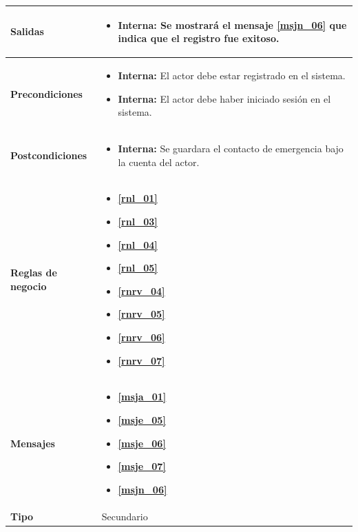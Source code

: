 \begin{center}
\begin{longtable}{| p{3.5cm} | p{11.5cm} |}
        \hline  
          \textbf{Salidas} &  
	\begin{itemize}
              \item \textbf{Interna}: Se mostrará el mensaje \textbf{\ref{msjn_06}} que indica que el registro fue exitoso.
           \end{itemize} \\
        \hline  
          \textbf{Precondiciones} & 
		\begin{itemize}
	              \item \textbf{Interna:} El actor debe estar registrado en el sistema.
	              \item \textbf{Interna:} El actor debe haber iniciado sesión en el sistema.
	            \end{itemize} \\
        \hline  
          \textbf{Postcondiciones} &
	\begin{itemize}
              \item \textbf{Interna:} Se guardara el contacto de emergencia bajo la cuenta del actor.
	\end{itemize} \\
        \hline
          \textbf{Reglas de negocio} & 
             \begin{itemize}
               \item \textbf{\ref{rnl_01}}
               \item \textbf{\ref{rnl_03}}
               \item \textbf{\ref{rnl_04}}
               \item \textbf{\ref{rnl_05}}
               \item \textbf{\ref{rnrv_04}}
               \item \textbf{\ref{rnrv_05}}
               \item \textbf{\ref{rnrv_06}}
               \item \textbf{\ref{rnrv_07}}
             \end{itemize} \\
        \hline
          \textbf{Mensajes} & 
              \begin{itemize}
                 \item \textbf{\ref{msja_01}}
                 \item \textbf{\ref{msje_05}}
                 \item \textbf{\ref{msje_06}}
                 \item \textbf{\ref{msje_07}}
                 \item \textbf{\ref{msjn_06}}
              \end{itemize}\\
        \hline
          \textbf{Tipo} & Secundario\\
        \hline      
  \end{longtable}
\end{center}
\endgroup


